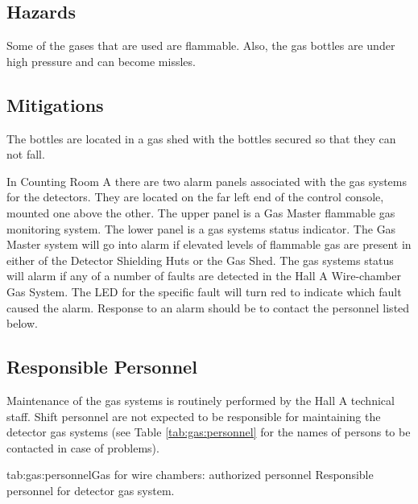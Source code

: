 \begin{safetyen}{0}{0}
\label{sec:hrs-det-gasalarms}

\subsection{Hazards}

Some of the gases that are used are flammable.  Also, the gas bottles
are under high pressure and can become missles.

\subsection{Mitigations}

The bottles are located in a gas shed with the bottles secured so that
they can not fall.

In Counting Room A there are two alarm panels associated with the gas
systems for the detectors.  They are located on the far left end of the
control console, mounted one above the other.  The upper panel is a
Gas Master flammable gas monitoring system.  The lower panel is a gas
systems status indicator.  The Gas Master system will go into alarm if
elevated levels of flammable gas are present in either of the Detector
Shielding Huts or the Gas Shed.
The gas systems status will
alarm if any of a number of faults are detected in the Hall A Wire-chamber
Gas System.  The LED for the specific fault will turn red to indicate which
fault caused the alarm.
Response to an alarm should be to contact the personnel listed below.

\subsection{Responsible Personnel}

Maintenance of the gas systems is routinely performed by the Hall A
technical staff.  Shift personnel are not expected to be responsible
for maintaining the detector gas systems (see Table \ref{tab:gas:personnel}  
for the names of persons to be contacted in case of problems). 

\begin{namestab}{tab:gas:personnel}{Gas for wire chambers: authorized personnel}{%
      Responsible personnel for detector gas system.}
  \JackSegal{}
\end{namestab}
\end{safetyen}
